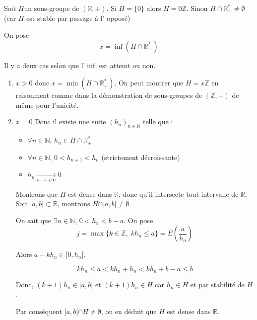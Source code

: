 \begin{myproof}{}{}
  Soit $H$un sous-groupe de $(\mathbb{R}, +)$. Si $H = \{0\}$ alors $H = 0 \mathbb{Z}$. Sinon $H \cap \mathbb{R}_+ ^{*} \ne \emptyset$ (car $H$ est stable par passage à l' opposé) 

  On pose 
  \begin{equation}
    x = \inf (H \cap \mathbb{R}_+ ^{*})
  \end{equation}

  Il y a deux cas selon que l'$\inf$ est atteint ou non. 

  \begin{enumerate}

    \item $x > 0 $ donc $ x = \min ( H \cap \mathbb{R}_+ ^{*})$. On peut montrer que $H = x \mathbb{Z}$ en raisonment comme dans la démonstration de sous-groupes de $(\mathbb{Z}, + )$ de même pour l'unicité.

    \item $x = 0 $ Donc il existe une suite $(h_n) _{n \in \mathbb{N}}$ telle que : 
      \begin{itemize}

          \item $\forall n \in \mathbb{N}$, $h_n \in H \cap \mathbb{R}_+ ^{*}$ 
          \item $\forall n \in \mathbb{N}$, $0 < h _{n+1} < h_n$ (strictement décroissante) 
          \item $h_n  \underset{n \to + \infty}{\longrightarrow} 0$
      \end{itemize}

      Montrons que $H$ est dense dans $\mathbb{R}$, donc qu'il intersecte tout intervalle de $\mathbb{R}$. Soit $]a, b[ \subset \mathbb{R}$, montrons $H \cap ]a, b[ \ne \emptyset$. 

      On sait que $\exists n \in \mathbb{N}$, $0< h_n < b-a$. On pose 
      \begin{equation}
        j = \max \{ k \in \mathbb{Z}, \; kh_n \le a\} = E \left( \frac{a}{h_n}  \right)
      \end{equation}

      Alors $a - kh_n \in [0, h_n[$. 

      \begin{equation}
        k h_n \le a < kh_n + h_n < kh_n + b-a \le b
      \end{equation}

      Donc, $(k+1) h_n \in ]a,b[$ et $(k+1) h_n \in H$ car $h_n \in H$ et par stabilité de $H$. 

      Par conséquent $]a,b[ \cap H \ne \emptyset$, on en déduit que $H$ est dense dans $\mathbb{R}$.
  \end{enumerate}
\end{myproof}

